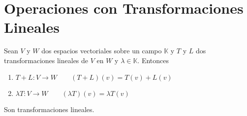 \begin{comment}
\begin{proof}
Se debe demostrar en ambos sentidos:
\begin{enumerate}[i.]
    \item Suponga que $T$ es invertible. Esto significa que existe una función $T^{-1}: W \to V$ tal que $T^{-1} \circ T = I_V$ y $T \circ T^{-1} = I_W$.\\
    Ahora, si $v \in Nu(T)$, entonces:
    \begin{align*}
        T(v) &= 0_W\\
        T^{-1}(T(v)) &= T^{-1}(0_W)\\
        v &= T^{-1}(0_W) = 0_V
    \end{align*}
    Esto significa que $Nu(T) = \llav{0_V}$, por lo tanto $T$ es inyectiva gracias al \textbf{Teorema 9.11}.\\
    Ahora, si $w \in W$, se tiene que $v = T^{-1}(w)\in V$, entonces:
    \begin{align*}
        v &= T^{-1}(w)\\
        T(v) &= T(T^{-1}(w))\\
        T(v) &= w
    \end{align*}
    Esto significa que para cualquier $w \in W$, existe un $v \in V$ tal que $T(v) = w$, por lo tanto $Im(T) = W$ y T es sobreyectiva
    
    \item Ahora supongamos que $T$ es biyectiva y que existe $L: W \to V$ tal que $L(w) = v$.\\
\end{enumerate}
\end{proof}
\end{comment}





\newpage
\section{Operaciones con Transformaciones Lineales}
\begin{dfn}
Sean $V$ y $W$ dos espacios vectoriales sobre un campo $\mathbb{K}$ y $T$ y $L$ dos transformaciones lineales de $V$ en $W$ y $\lambda \in \mathbb{K}$. Entonces 
\begin{enumerate}
\item $T + L : V \to W \qquad (T + L)(v) = T(v) + L(v)$
\item $\lambda T : V \to W \qquad (\lambda T)(v) = \lambda T(v)$
\end{enumerate}
Son transformaciones lineales.
\end{dfn}

